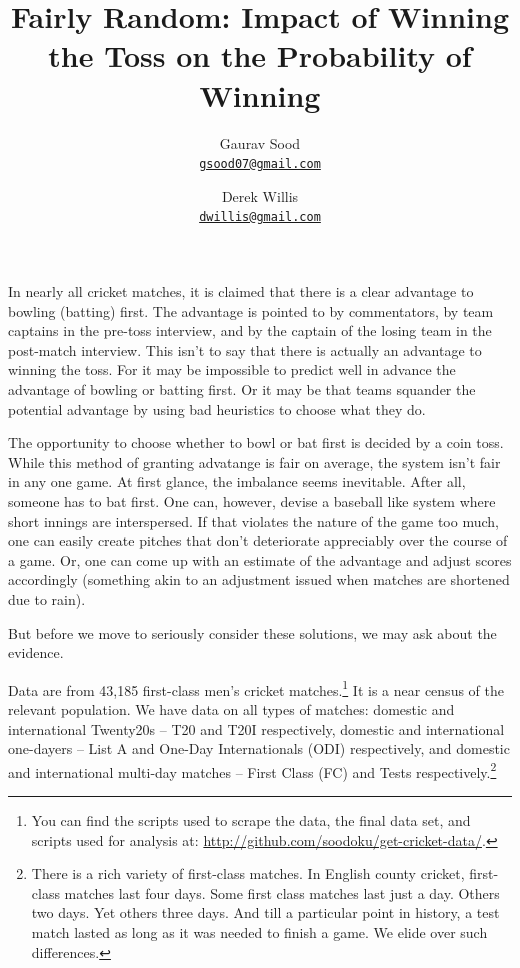\documentclass[11pt]{article}
\begin{document}
\title{\vspace{-1.5cm}\normalsize{\textbf{Fairly Random: Impact of Winning the Toss on the Probability of Winning}}}
\author{Gaurav Sood\\\small{\href{mailto:gsood07@gmail.com}{\tt{gsood07@gmail.com}}} \and Derek Willis\\\small{\href{mailto:dwillis@gmail.com}{\tt{dwillis@gmail.com}}}}
\maketitle
\doublespacing

In nearly all cricket matches, it is claimed that there is a clear advantage to bowling (batting) first. The advantage is pointed to by commentators, by team captains in the pre-toss interview, and by the captain of the losing team in the post-match interview. This isn't to say that there is actually an advantage to winning the toss. For it may be impossible to predict well in advance the advantage of bowling or batting first. Or it may be that teams squander the potential advantage by using bad heuristics to choose what they do.

The opportunity to choose whether to bowl or bat first is decided by a coin toss. While this method of granting advatange is fair on average, the system isn't fair in any one game. At first glance, the imbalance seems inevitable. After all, someone has to bat first. One can, however, devise a baseball like system where short innings are interspersed. If that violates the nature of the game too much, one can easily create pitches that don't deteriorate appreciably over the course of a game. Or, one can come up with an estimate of the advantage and adjust scores accordingly (something akin to an adjustment issued when matches are shortened due to rain).

But before we move to seriously consider these solutions, we may ask about the evidence.

Data are from 43,185 first-class men's cricket matches.\footnote{You can find the scripts used to scrape the data, the final data set, and scripts used for analysis at: \href{http://github.com/soodoku/get-cricket-data/}{http://github.com/soodoku/get-cricket-data/}.} It is a near census of the relevant population. We have data on all types of matches: domestic and international Twenty20s -- T20 and T20I respectively, domestic and international one-dayers -- List A and One-Day Internationals (ODI) respectively, and domestic and international multi-day matches -- First Class (FC) and Tests respectively.\footnote{There is a rich variety of first-class matches. In English county cricket, first-class matches last four days. Some first class matches last just a day. Others two days. Yet others three days. And till a particular point in history, a test match lasted as long as it was needed to finish a game. We elide over such differences.} 
\end{document}
